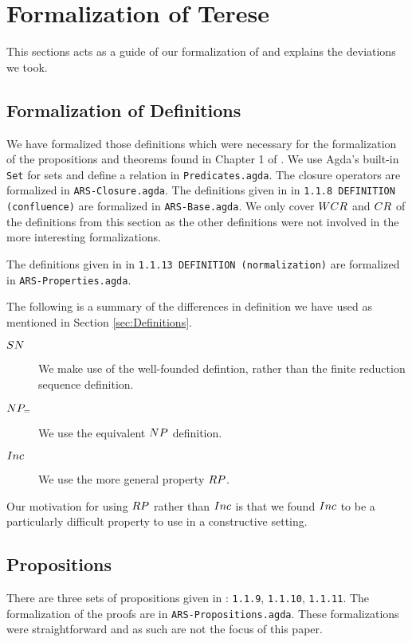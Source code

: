 \section{Formalization of Terese}
\label{sec:Formalization}
This sections acts as a guide of our formalization of \terese and explains the deviations we took.  

\subsection{Formalization of Definitions}
We have formalized those definitions which were necessary for the formalization of the propositions and theorems found 
in Chapter 1 of \terese. We use Agda's built-in \texttt{Set} for sets and define a relation in \texttt{Predicates.agda}.
The closure operators are formalized in \texttt{ARS-Closure.agda}. 
The definitions given in \terese in \texttt{1.1.8 DEFINITION (confluence)} 
are formalized in \texttt{ARS-Base.agda}. We only cover $\WCR$ and $\CR$ of the definitions from this section 
as the other definitions were not involved in the more interesting formalizations.

The definitions given in \terese in \texttt{1.1.13 DEFINITION (normalization)} 
are formalized in \texttt{ARS-Properties.agda}.  


The following is a summary of the differences in definition we have used as mentioned in Section \ref{sec:Definitions}. 
\begin{description}
    \item[$\SN$] We make use of the well-founded defintion, rather than the finite reduction sequence definition.
    \item[$\NPe$] We use the equivalent $\NP$ definition. 
    \item[$\Inc$] We use the more general property $\RP$.      
\end{description}

Our motivation for using $\RP$ rather than $\Inc$ is that we found $\Inc$ to be a particularly difficult property 
to use in a constructive setting. 

\subsection{Propositions}
There are three sets of propositions given in \terese: \texttt{1.1.9}, \texttt{1.1.10}, \texttt{1.1.11}. 
The formalization of the proofs are in \texttt{ARS-Propositions.agda}. These formalizations were straightforward 
and as such are not the focus of this paper. 


